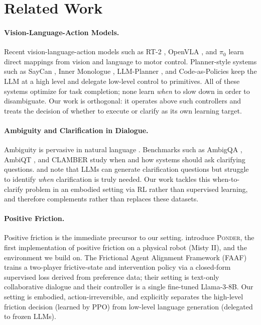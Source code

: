 \section{Related Work}
\label{sec:related}

\paragraph{Vision-Language-Action Models.}
Recent vision-language-action models such as RT-2 \cite{zitkovich2023rt2}, OpenVLA \cite{kim2025openvla}, and $\pi_0$ \cite{black2024pi0} learn direct mappings from vision and language to motor control. Planner-style systems such as SayCan \cite{ahn2022saycan}, Inner Monologue \cite{huang2023inner}, LLM-Planner \cite{song2023llmplanner}, and Code-as-Policies \cite{liang2023codeaspolicies} keep the LLM at a high level and delegate low-level control to primitives. All of these systems optimize for task completion; none learn \emph{when} to slow down in order to disambiguate. Our work is orthogonal: it operates above such controllers and treats the decision of whether to execute or clarify as its own learning target.

\paragraph{Ambiguity and Clarification in Dialogue.}
Ambiguity is pervasive in natural language \cite{poesio2005anaphoric,piantadosi2012communicative}. Benchmarks such as AmbigQA \cite{min2020ambigqa}, AmbiQT \cite{bhaskar2023ambiqt}, and CLAMBER \cite{zhang2024clamber} study when and how systems should ask clarifying questions. \citet{deng2023prompting} and \citet{zhang2024modeling} note that LLMs can generate clarification questions but struggle to identify \emph{when} clarification is truly needed. Our work tackles this when-to-clarify problem in an embodied setting via RL rather than supervised learning, and therefore complements rather than replaces these datasets.

\paragraph{Positive Friction.}
Positive friction \cite{inan2025betterslow,obiso2025dynamic} is the immediate precursor to our setting. \citet{ponder2026} introduce \textsc{Ponder}, the first implementation of positive friction on a physical robot (Misty II), and the environment we build on. The Frictional Agent Alignment Framework (FAAF) \cite{nath2025faaf} trains a two-player frictive-state and intervention policy via a closed-form supervised loss derived from preference data; their setting is text-only collaborative dialogue and their controller is a single fine-tuned Llama-3-8B. Our setting is embodied, action-irreversible, and explicitly separates the high-level friction decision (learned by PPO) from low-level language generation (delegated to frozen LLMs).

